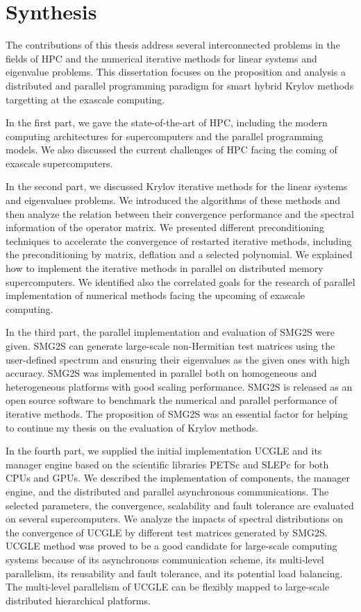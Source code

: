 \section{Synthesis}

The contributions of this thesis address several interconnected problems in the fields of HPC and the numerical iterative methods for linear systems and eigenvalue problems. This dissertation focuses on the proposition and analysis a distributed and parallel programming paradigm for smart hybrid Krylov methods targetting at the exascale computing.

In the first part, we gave the state-of-the-art of HPC, including the modern computing architectures for supercomputers and the parallel programming models. We also discussed the current challenges of HPC facing the coming of exascale supercomputers.

In the second part, we discussed Krylov iterative methods for the linear systems and eigenvalues problems. We introduced the algorithms of these methods and then analyze the relation between their convergence performance and the spectral information of the operator matrix. We presented different preconditioning techniques to accelerate the convergence of restarted iterative methods, including the preconditioning by matrix, deflation and a selected polynomial.  We explained how to implement the iterative methods in parallel on distributed memory supercomputers. We identified also the correlated goals for the research of parallel implementation of numerical methods facing the upcoming of exascale computing.

In the third part, the parallel implementation and evaluation of SMG2S were given. SMG2S can generate large-scale non-Hermitian test matrices using the user-defined spectrum and ensuring their eigenvalues as the given ones with high accuracy. SMG2S was implemented in parallel both on homogeneous and heterogeneous platforms with good scaling performance. SMG2S is released as an open source software to benchmark the numerical and parallel performance of iterative methods. The proposition of SMG2S was an essential factor for helping to continue my thesis on the evaluation of Krylov methods.

In the fourth part, we supplied the initial implementation UCGLE and its manager engine based on the scientific libraries PETSc and SLEPc for both CPUs and GPUs. We described the implementation of components, the manager engine, and the distributed and parallel asynchronous communications. The selected parameters, the convergence, scalability and fault tolerance are evaluated on several supercomputers. We analyze the impacts of spectral distributions on the convergence of UCGLE by different test matrices generated by SMG2S. UCGLE method was proved to be a good candidate for large-scale computing systems because of its asynchronous communication scheme, its multi-level parallelism, its reusability and fault tolerance, and its potential load balancing. The multi-level parallelism of UCGLE can be flexibly mapped to large-scale distributed hierarchical platforms.

